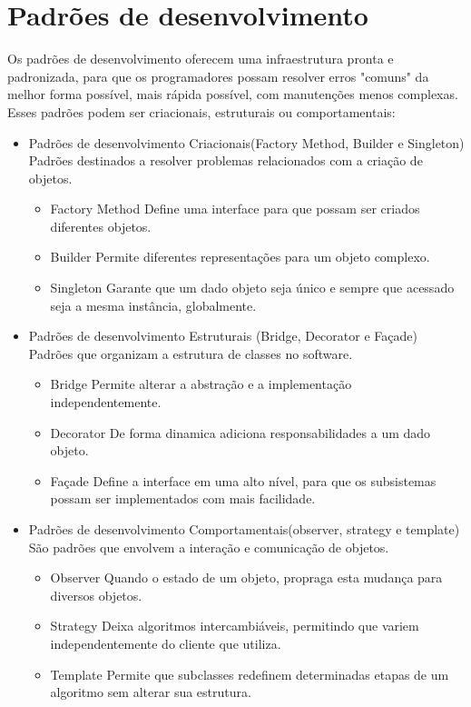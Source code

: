 \documentclass[12pt]{article}
\begin{document}
    \section{Padrões de desenvolvimento}
        Os padrões de desenvolvimento oferecem uma infraestrutura pronta e padronizada, para que os programadores possam resolver erros "comuns" da melhor forma possível, mais rápida possível, com manutenções menos complexas. Esses padrões podem ser criacionais, estruturais ou comportamentais:
        \begin{itemize}
            \item Padrões de desenvolvimento Criacionais(Factory Method, Builder e Singleton)
            Padrões destinados a resolver problemas relacionados com a criação de objetos. 
            \begin{itemize}
                \item Factory Method
                Define uma interface para que possam ser criados diferentes objetos.
                \item Builder
                Permite diferentes representações para um objeto complexo.
                \item Singleton
                Garante que um dado objeto seja único e sempre que acessado seja a mesma instância, globalmente.
            \end{itemize}
            \item Padrões de desenvolvimento Estruturais (Bridge, Decorator e Façade)
            Padrões que organizam a estrutura de classes no software.
            \begin{itemize}
                \item Bridge
                    Permite alterar a abstração e a implementação independentemente.
                \item Decorator
                    De forma dinamica adiciona responsabilidades a um dado objeto.
                \item Façade
                    Define a interface em uma alto nível, para que os subsistemas possam ser implementados com mais facilidade.
            \end{itemize}
            \item Padrões de desenvolvimento Comportamentais(observer, strategy e template)
                São padrões que envolvem a interação e comunicação de objetos.
                \begin{itemize}
                    \item Observer
                        Quando o estado de um objeto, propraga esta mudança para diversos objetos.
                    \item Strategy
                        Deixa algoritmos intercambiáveis, permitindo que variem independentemente do cliente que utiliza.
                    \item Template
                        Permite que subclasses redefinem determinadas etapas de um algoritmo sem alterar sua estrutura.
                \end{itemize}
        \end{itemize}
\end{document}
